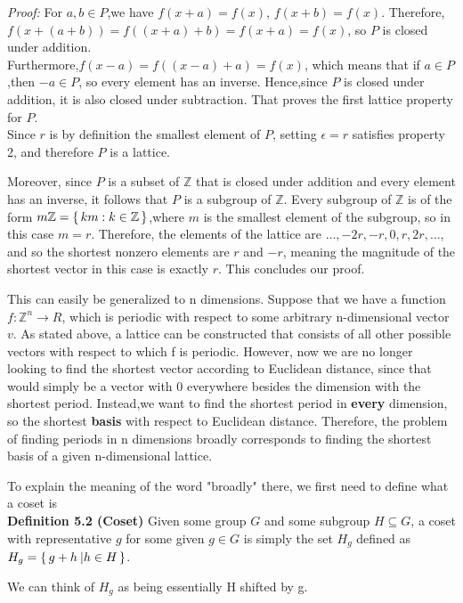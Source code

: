 \textit{Proof:} For $a,b \in P$,we have $f(x+a) = f(x)$, $f(x+b) = f(x)$. Therefore, $f(x+ (a + b)) = f((x+a) + b) = f(x+a) = f(x)$, so $P$ is closed under addition.\\
Furthermore,$f(x-a) = f((x-a) + a) = f(x)$, which means that if $a\in P$,then $-a \in P$, so every element has an inverse. Hence,since $P$ is closed under addition, it is also closed under subtraction. That proves the first lattice property for $P$.\\
Since $r$ is by definition the smallest element of $P$, setting $\epsilon = r$ satisfies property 2, and therefore $P$ is a lattice.

Moreover, since $P$ is a subset of $\mathbb{Z}$ that is closed under addition and every element has an inverse, it follows that $P$ is a subgroup of $\mathbb{Z}$. Every subgroup of $\mathbb{Z}$ is of the form $m\mathbb{Z} = \set{km : k \in \mathbb{Z}}$,where $m$ is the smallest element of the subgroup, so in this case $m = r$. Therefore, the elements of the lattice are $\dots,-2r,-r,0,r,2r,\dots$, and so the shortest nonzero elements are $r$ and $-r$, meaning the magnitude of the shortest vector in this case is exactly $r$. This concludes our proof.

This can easily be generalized to n dimensions. Suppose that we have a function $f:\mathbb{Z}^n \to R$, which is periodic with respect to some arbitrary n-dimensional vector $v$. As stated above, a lattice can be constructed that consists of all other possible vectors with respect to which f is periodic. However, now we are no longer looking to find the shortest vector according to Euclidean distance, since that would simply be a vector with 0 everywhere besides the dimension with the shortest period. Instead,we want to find the shortest period in \textbf{every} dimension, so the shortest \textbf{basis} with respect to Euclidean distance. Therefore, the problem of finding periods in n dimensions broadly corresponds to finding the shortest basis of a given n-dimensional lattice.

To explain the meaning of the word "broadly" there, we first need to define what a coset is\\

\textbf{Definition 5.2 (Coset)} Given some group $G$ and some subgroup $H \subseteq G$, a coset with representative $g$ for some given $g \in G$ is simply the set $H_g$ defined as $H_g = \set{g + h\: \rvert h \in H}$.
 
We can think of $H_g$ as being essentially H shifted by g.

